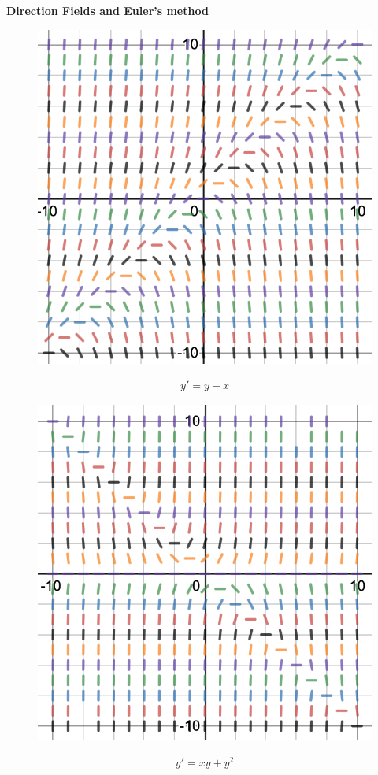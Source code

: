 \textbf{Direction Fields and Euler's method}
\begin{figure}[h]
    \centering
    \includegraphics[scale=0.30]{1.png}
    \label{fig:1}
\end{figure}
\begin{align}
   y'=y-x
\end{align}
\begin{figure}[h]
    \centering
    \includegraphics[scale=0.30]{2.png}
    \label{fig:2}
\end{figure}
\begin{align}
   y'=xy+y^{2}
\end{align}

